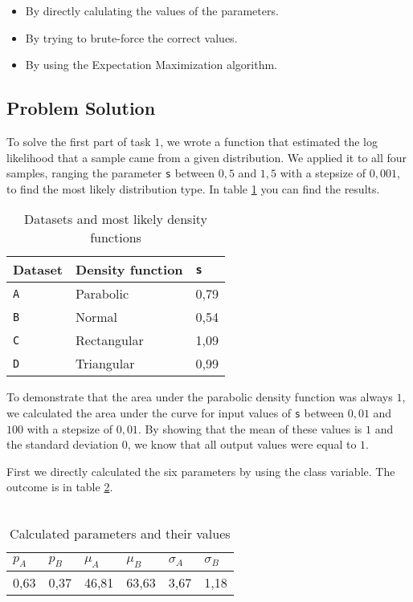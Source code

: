 \documentclass{article}
\begin{document}
\begin{itemize}
\item By directly calulating the values of the parameters.
\item By trying to brute-force the correct values.
\item By using the Expectation Maximization algorithm.
\end{itemize} 

\subsection{Problem Solution}
To solve the first part of task $1$, we wrote a function that estimated the log likelihood that a sample came from a given distribution. We applied it to all four samples, ranging the parameter \verb+s+ between $0,5$ and $1,5$ with a stepsize of $0,001$, to find the most likely distribution type. In table \ref{table:data1} you can find the results. \\

\begin{table}[!h]
	\begin{center}
		\begin{tabular}{l|l|l}
			Dataset & Density function & \verb+s+ \\
			\hline
			\verb+A+ & Parabolic   & 0,79  \\
			\verb+B+ & Normal  & 0,54 \\
			\verb+C+ & Rectangular   & 1,09   \\
			\verb+D+ & Triangular   & 0,99   \\
		\end{tabular}
		\caption{Datasets and most likely density functions}
		\label{table:data1}
	\end{center}
\end{table}

To demonstrate that the area under the parabolic density function was always $1$, we calculated the area under the curve for input values of \verb+s+ between $0,01$ and $100$ with a stepsize of $0,01$. By showing that the mean of these values is $1$ and the standard deviation $0$, we know that all output values were equal to $1$.

First we directly calculated the six parameters by using the class variable. The outcome is in table \ref{table:data2}. \\\\

\begin{table}[!h]
	\begin{center}
		\begin{tabular}{l|l|l|l|l|l}
			$p_A$ & $p_B$ & $\mu_A$ & $\mu_B$ & $\sigma_A$ & $\sigma_B$ \\
			\hline
			0,63 & 0,37 & 46,81 & 63,63 & 3,67 & 1,18 \\
		\end{tabular}
		\caption{Calculated parameters and their values}
		\label{table:data2}
	\end{center}
\end{table}
\end{document}
